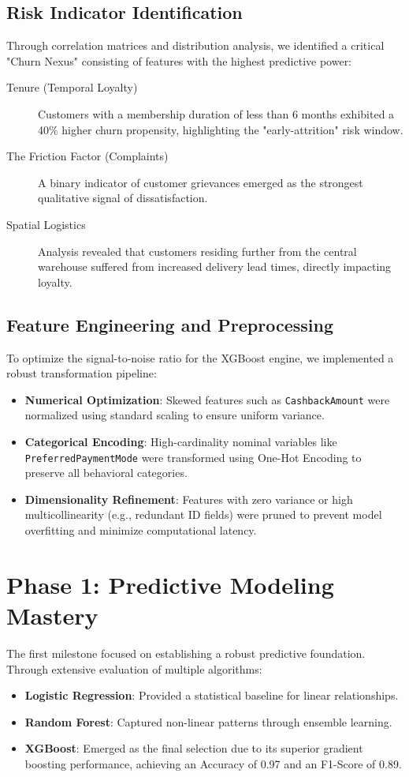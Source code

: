 \documentclass[a4paper,12pt]{article}
\begin{document}
\subsection{Risk Indicator Identification}
Through correlation matrices and distribution analysis, we identified a critical "Churn Nexus" consisting of features with the highest predictive power:
\begin{description}
    \item[Tenure (Temporal Loyalty)] Customers with a membership duration of less than 6 months exhibited a 40\% higher churn propensity, highlighting the "early-attrition" risk window.
    \item[The Friction Factor (Complaints)] A binary indicator of customer grievances emerged as the strongest qualitative signal of dissatisfaction.
    \item[Spatial Logistics] Analysis revealed that customers residing further from the central warehouse suffered from increased delivery lead times, directly impacting loyalty.
\end{description}

\subsection{Feature Engineering and Preprocessing}
To optimize the signal-to-noise ratio for the XGBoost engine, we implemented a robust transformation pipeline:
\begin{itemize}
    \item \textbf{Numerical Optimization}: Skewed features such as \texttt{CashbackAmount} were normalized using standard scaling to ensure uniform variance.
    \item \textbf{Categorical Encoding}: High-cardinality nominal variables like \texttt{PreferredPaymentMode} were transformed using One-Hot Encoding to preserve all behavioral categories.
    \item \textbf{Dimensionality Refinement}: Features with zero variance or high multicollinearity (e.g., redundant ID fields) were pruned to prevent model overfitting and minimize computational latency.
\end{itemize}

\section{Phase 1: Predictive Modeling Mastery}
The first milestone focused on establishing a robust predictive foundation. Through extensive evaluation of multiple algorithms:
\begin{itemize}
    \item \textbf{Logistic Regression}: Provided a statistical baseline for linear relationships.
    \item \textbf{Random Forest}: Captured non-linear patterns through ensemble learning.
    \item \textbf{XGBoost}: Emerged as the final selection due to its superior gradient boosting performance, achieving an Accuracy of 0.97 and an F1-Score of 0.89.
\end{itemize}
\end{document}
